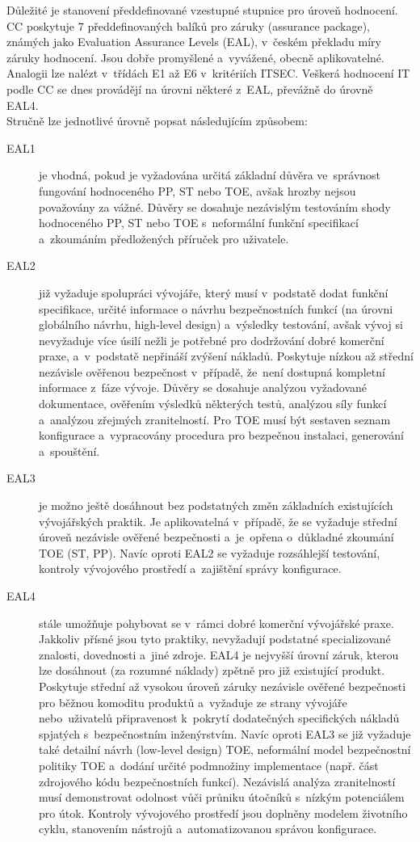 \documentclass[a4paper,12pt]{article}
\begin{document}
Důležité je stanovení předdefinované vzestupné stupnice pro úroveň hodnocení. CC poskytuje 7 předdefinovaných balíků pro záruky (assurance package), známých jako Evaluation Assurance Levels (EAL), v~českém překladu míry záruky hodnocení. Jsou dobře promyšlené a~vyvážené, obecně aplikovatelné. Analogii lze nalézt v~třídách E1 až E6 v~kritériích ITSEC. Veškerá hodnocení IT podle CC se dnes provádějí na úrovni některé z~EAL, převážně do úrovně EAL4.~\cite{NBUHodnoceniBezpecnostiSW}\\

Stručně lze jednotlivé úrovně popsat následujícím způsobem:
\begin{description}
 \item[EAL1] je vhodná, pokud je vyžadována určitá základní důvěra ve~správnost fungování hodnoceného PP, ST nebo TOE, avšak hrozby nejsou považovány za vážné. Důvěry se dosahuje nezávislým testováním shody hodnoceného PP, ST nebo TOE s~neformální funkční specifikací a~zkoumáním předložených příruček pro uživatele.~\cite{NBUHodnoceniBezpecnostiSW}
 \item[EAL2] již vyžaduje spolupráci vývojáře, který musí v~podstatě dodat funkční specifikace, určité informace o návrhu bezpečnostních funkcí (na úrovni globálního návrhu, high-level design) a~výsledky testování, avšak vývoj si nevyžaduje více úsilí nežli je potřebné pro dodržování dobré komerční praxe, a~v~podstatě nepřináší zvýšení nákladů. Poskytuje nízkou až střední nezávisle ověřenou bezpečnost v~případě, že~není dostupná kompletní informace z~fáze vývoje. Důvěry se dosahuje analýzou vyžadované dokumentace, ověřením výsledků některých testů, analýzou síly funkcí a~analýzou zřejmých zranitelností. Pro TOE musí být sestaven seznam konfigurace a~vypracovány procedura pro bezpečnou instalaci, generování a~spouštění.~\cite{NBUHodnoceniBezpecnostiSW}
 \item[EAL3] je možno ještě dosáhnout bez podstatných změn základních existujících vývojářských praktik. Je aplikovatelná v~případě, že se vyžaduje střední úroveň nezávisle ověřené bezpečnosti a~je~opřena o~důkladné zkoumání TOE (ST, PP). Navíc oproti EAL2 se vyžaduje rozsáhlejší testování, kontroly vývojového prostředí a~zajištění správy konfigurace.~\cite{NBUHodnoceniBezpecnostiSW}
 \item[EAL4] stále umožňuje pohybovat se v~rámci dobré komerční vývojářské praxe. Jakkoliv přísné jsou tyto praktiky, nevyžadují podstatné specializované znalosti, dovednosti a~jiné zdroje. EAL4 je nejvyšší úrovní záruk, kterou lze dosáhnout (za rozumné náklady) zpětně pro již existující produkt. Poskytuje střední až vysokou úroveň záruky nezávisle ověřené bezpečnosti pro běžnou komoditu produktů a~vyžaduje ze strany vývojáře nebo~uživatelů připravenost k~pokrytí dodatečných specifických nákladů spjatých s~bezpečnostním inženýrstvím. Navíc oproti EAL3 se již vyžaduje také detailní návrh (low-level design) TOE, neformální model bezpečnostní politiky TOE a~dodání určité podmnožiny implementace (např. část zdrojového kódu bezpečnostních funkcí). Nezávislá analýza zranitelností musí demonstrovat odolnost vůči průniku útočníků s~nízkým potenciálem pro útok. Kontroly vývojového prostředí jsou doplněny modelem životního cyklu, stanovením nástrojů a~automatizovanou správou konfigurace.~\cite{NBUHodnoceniBezpecnostiSW}

\end{description}
\end{document}
